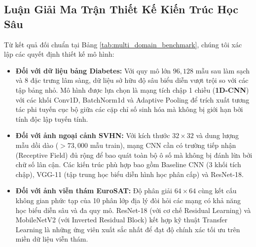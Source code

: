 \documentclass[12pt,a4paper]{report}
\begin{document}
\subsection{Luận Giải Ma Trận Thiết Kế Kiến Trúc Học Sâu}
Từ kết quả đối chuẩn tại Bảng \ref{tab:multi_domain_benchmark}, chúng tôi xác lập các quyết định thiết kế mô hình:
\begin{itemize}[leftmargin=*]
    \item \textbf{Đối với dữ liệu bảng Diabetes:} Với quy mô lớn $96,128$ mẫu sau làm sạch và 8 đặc trưng lâm sàng, dữ liệu sở hữu độ sâu biểu diễn vượt trội so với các tập bảng nhỏ. Mô hình được lựa chọn là mạng tích chập 1 chiều (\textbf{1D-CNN}) với các khối Conv1D, BatchNorm1d và Adaptive Pooling để trích xuất tương tác phi tuyến cục bộ giữa các cặp chỉ số sinh hóa mà không bị giới hạn bởi tính độc lập tuyến tính.
    \item \textbf{Đối với ảnh ngoại cảnh SVHN:} Với kích thước $32 \times 32$ và dung lượng mẫu dồi dào ($>73,000$ mẫu train), mạng CNN cần có trường tiếp nhận (Receptive Field) đủ rộng để bao quát toàn bộ ô số mà không bị đánh lừa bởi chữ số lân cận. Các kiến trúc phù hợp bao gồm Baseline CNN (3 khối tích chập), VGG-11 (tập trung học biểu diễn hình học phân cấp) và ResNet-18.
    \item \textbf{Đối với ảnh viễn thám EuroSAT:} Độ phân giải $64 \times 64$ cùng kết cấu không gian phức tạp của 10 phân lớp địa lý đòi hỏi các mạng có khả năng học biểu diễn sâu và đa quy mô. ResNet-18 (với cơ chế Residual Learning) và MobileNetV2 (với Inverted Residual Block) kết hợp kỹ thuật Transfer Learning là những ứng viên xuất sắc nhất để đạt độ chính xác tối ưu trên miền dữ liệu viễn thám.
\end{itemize}

\end{document}
